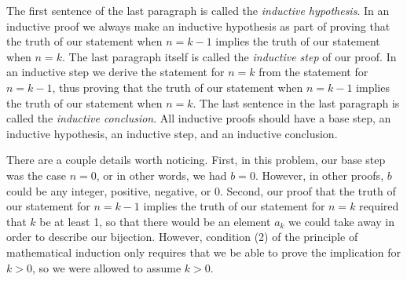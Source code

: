 \documentclass[10pt,]{book}
\theoremstyle{plain}
\theoremstyle{definition}
\numberwithin{equation}{chapter}
\begin{document}
The first sentence of the last paragraph is called the \emph{inductive hypothesis}. In an inductive proof we always make an inductive hypothesis as part of proving that the truth of our statement when \(n=k-1\) implies the truth of our statement when \(n=k\). The last paragraph itself is called the \emph{inductive step} of our proof. In an inductive step we derive the statement for \(n=k\) from the statement for \(n=k-1\), thus proving that the truth of our statement when \(n=k-1\) implies the truth of our statement when \(n=k\). The last sentence in the last paragraph is called the \emph{inductive conclusion}. All inductive proofs should have a base step, an inductive hypothesis, an inductive step, and an inductive conclusion.%
\par
There are a couple details worth noticing. First, in this problem, our base step was the case \(n=0\), or in other words, we had \(b=0\). However, in other proofs, \(b\) could be any integer, positive, negative, or 0. Second, our proof that the truth of our statement for \(n=k-1\) implies the truth of our statement for \(n=k\) required that \(k\) be at least 1, so that there would be an element \(a_k\) we could take away in order to describe our bijection. However, condition (2) of the principle of mathematical induction only requires that we be able to prove the implication for \(k>0\), so we were allowed to assume \(k>0\).%
\typeout{************************************************}
\typeout{************************************************}
\end{document}
